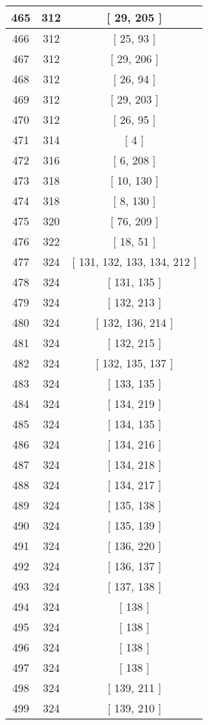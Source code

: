 \begin{center}
\begin{longtable}[H]{|| c c c ||}
\hline
465 & 312 & [ 29, 205 ] \\ 
\hline
466 & 312 & [ 25, 93 ] \\ 
\hline
467 & 312 & [ 29, 206 ] \\ 
\hline
468 & 312 & [ 26, 94 ] \\ 
\hline
469 & 312 & [ 29, 203 ] \\ 
\hline
470 & 312 & [ 26, 95 ] \\ 
\hline
471 & 314 & [ 4 ] \\ 
\hline
472 & 316 & [ 6, 208 ] \\ 
\hline
473 & 318 & [ 10, 130 ] \\ 
\hline
474 & 318 & [ 8, 130 ] \\ 
\hline
475 & 320 & [ 76, 209 ] \\ 
\hline
476 & 322 & [ 18, 51 ] \\ 
\hline
477 & 324 & [ 131, 132, 133, 134, 212 ] \\ 
\hline
478 & 324 & [ 131, 135 ] \\ 
\hline
479 & 324 & [ 132, 213 ] \\ 
\hline
480 & 324 & [ 132, 136, 214 ] \\ 
\hline
481 & 324 & [ 132, 215 ] \\ 
\hline
482 & 324 & [ 132, 135, 137 ] \\ 
\hline
483 & 324 & [ 133, 135 ] \\ 
\hline
484 & 324 & [ 134, 219 ] \\ 
\hline
485 & 324 & [ 134, 135 ] \\ 
\hline
486 & 324 & [ 134, 216 ] \\ 
\hline
487 & 324 & [ 134, 218 ] \\ 
\hline
488 & 324 & [ 134, 217 ] \\ 
\hline
489 & 324 & [ 135, 138 ] \\ 
\hline
490 & 324 & [ 135, 139 ] \\ 
\hline
491 & 324 & [ 136, 220 ] \\ 
\hline
492 & 324 & [ 136, 137 ] \\ 
\hline
493 & 324 & [ 137, 138 ] \\ 
\hline
494 & 324 & [ 138 ] \\ 
\hline
495 & 324 & [ 138 ] \\ 
\hline
496 & 324 & [ 138 ] \\ 
\hline
497 & 324 & [ 138 ] \\ 
\hline
498 & 324 & [ 139, 211 ] \\ 
\hline
499 & 324 & [ 139, 210 ] \\ 

\end{longtable}
\end{center}
